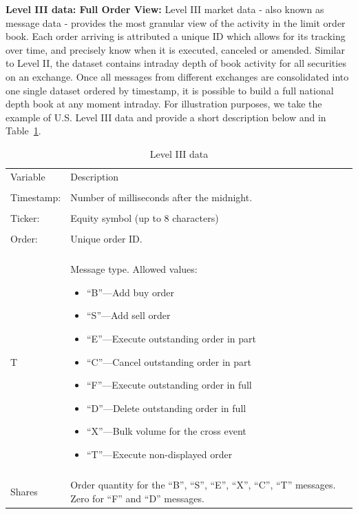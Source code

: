 \noindent\textbf{Level III data: Full Order View:} Level III market data - also known as message data - provides the most granular view of the activity in the limit order book. Each order arriving is attributed a unique ID which allows for its tracking over time, and precisely know when it is executed, canceled or amended. Similar to Level II, the dataset contains intraday depth of book activity for all securities on an exchange. Once all messages from different exchanges are consolidated into one single dataset ordered by timestamp, it is possible to build a full national depth book at any moment intraday. For illustration purposes, we take the example of U.S. Level III data and provide a short description below and in Table~\ref{tab:level3data}. \\
	\begin{table}[!ht]
	\centering
	\caption{Level III data \label{tab:level3data}}
	\begin{tabular}{lp{}} \hline
	Variable & Description \\
	& \\
	Timestamp: & Number of milliseconds after the midnight. \\
	& \\
	Ticker: & Equity symbol (up to 8 characters) \\
	& \\
	Order: & Unique order ID. \\
	& \\
	T & Message type. Allowed values: \newline \begin{minipage}[t]{0.6\textwidth} \begin{itemize} \item ``B''---Add buy order \item ``S''---Add sell order \item ``E''---Execute outstanding order in part \item ``C''---Cancel outstanding order in part \item ``F''---Execute outstanding order in full \item ``D''---Delete outstanding order in full \item ``X''---Bulk volume for the cross event \item ``T''---Execute non-displayed order \end{itemize} \end{minipage} \\
	& \\
	Shares & Order quantity for the ``B'', ``S'', ``E'', ``X'', ``C'', ``T'' messages. Zero for ``F'' and ``D'' messages. \\

\end{tabular}
\end{table}
